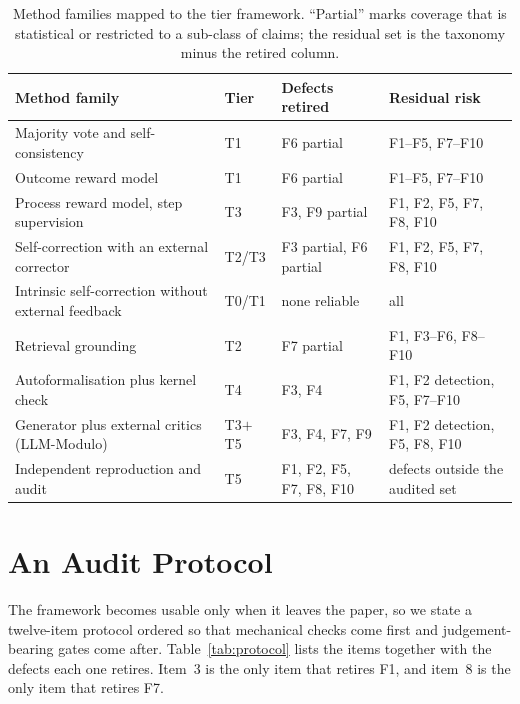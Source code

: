 \documentclass[11pt]{article}
\theoremstyle{plain}
\theoremstyle{definition}
\begin{document}
\begin{table}[t]
\centering
\small
\caption{Method families mapped to the tier framework. ``Partial'' marks coverage that is
statistical or restricted to a sub-class of claims; the residual set is the taxonomy minus the
retired column.}
\label{tab:coverage}
\begin{tabular}{@{}p{4.1cm}p{1.1cm}p{3.2cm}p{4.4cm}@{}}
\toprule
Method family & Tier & Defects retired & Residual risk \\
\midrule
Majority vote and self-consistency \citep{wang2023selfconsistency} & T1 & F6 partial
& F1--F5, F7--F10 \\
Outcome reward model \citep{cobbe2021gsm8k} & T1 & F6 partial & F1--F5, F7--F10 \\
Process reward model, step supervision \citep{lightman2023verify,uesato2022process,wang2024mathshepherd}
& T3 & F3, F9 partial & F1, F2, F5, F7, F8, F10 \\
Self-correction with an external corrector \citep{welleck2022selfcorrect} & T2/T3
& F3 partial, F6 partial & F1, F2, F5, F7, F8, F10 \\
Intrinsic self-correction without external feedback \citep{huang2024selfcorrect} & T0/T1
& none reliable & all \\
Retrieval grounding \citep{lewis2020rag} & T2 & F7 partial & F1, F3--F6, F8--F10 \\
Autoformalisation plus kernel check \citep{wu2022autoformalization,jiang2023draft,yang2023leandojo}
& T4 & F3, F4 & F1, F2 detection, F5, F7--F10 \\
Generator plus external critics (LLM-Modulo) \citep{kambhampati2024llmmodulo} & T3$+$T5
& F3, F4, F7, F9 & F1, F2 detection, F5, F8, F10 \\
Independent reproduction and audit & T5 & F1, F2, F5, F7, F8, F10
& defects outside the audited set \\
\bottomrule
\end{tabular}
\end{table}
\section{An Audit Protocol}
\label{sec:protocol}

The framework becomes usable only when it leaves the paper, so we state a twelve-item protocol
ordered so that mechanical checks come first and judgement-bearing gates come after.
Table~\ref{tab:protocol} lists the items together with the defects each one retires. Item~3 is
the only item that retires F1, and item~8 is the only item that retires F7.
\end{document}
